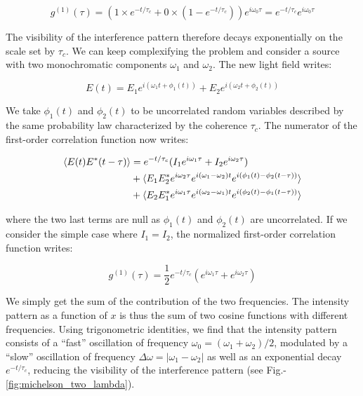 \begin{equation}
    g^{(1)} (\tau) = (1 \times e^{-t/\tau_c} + 0 \times (1-e^{-t/\tau_c})) e^{i \omega_0 \tau} = e^{-t/\tau_c}  e^{i \omega_0 \tau}
\end{equation}

The visibility of the interference pattern therefore decays exponentially on the scale set by $\tau_c$. We can keep complexifying the problem and consider a source with two monochromatic components $\omega_1$ and $\omega_2$. The new light field writes:

\begin{equation}
    E(t)= E_1 e^{i (\omega_1 t + \phi_1(t))} + E_2 e^{i (\omega_2 t+ \phi_2(t))} 
\end{equation}

\noindent We take $\phi_1(t)$ and $\phi_2(t)$ to be uncorrelated random variables described by the same probability law characterized by the coherence $\tau_c$. The numerator of the first-order correlation function now writes:

\begin{equation}
\begin{split}
       \langle E(t) E^*(t-\tau)\rangle  &= e^{-t/\tau_c}  (I_1 e^{i \omega_1 \tau} + I_2 e^{i \omega_2 \tau}) \\ 
       &+ \langle E_1 E_2^* e^{i \omega_2 \tau} e^{i (\omega_1 - \omega_2)t} e^{i(\phi_1(t)-\phi_2(t-\tau))}\rangle \\
       &+ \langle E_2 E_1^* e^{i \omega_1 \tau} e^{i (\omega_2 - \omega_1)t} e^{i(\phi_2(t)-\phi_1(t-\tau))}\rangle
\end{split}
\end{equation}

\noindent where the two last terms are null as $\phi_1(t)$ and $\phi_2(t)$ are uncorrelated. If we consider the simple case where $I_1=I_2$, the normalized first-order correlation function writes:

\begin{equation}
    g^{(1)} (\tau) = \frac{1}{2}  e^{-t/\tau_c} (e^{i \omega_1 \tau} + e^{i \omega_2 \tau})
\end{equation}

\noindent We simply get the sum of the contribution of the two frequencies. The intensity pattern as a function of $x$ is thus the sum of two cosine functions with different frequencies. Using trigonometric identities, we find that the intensity pattern consists of a ``fast'' oscillation of frequency $\omega_0=(\omega_1 + \omega_2)/2$, modulated by a ``slow'' oscillation of frequency $\Delta \omega = |\omega_1 - \omega_2|$ as well as an exponential decay $e^{-t/\tau_c}$, reducing the visibility of the interference pattern (see Fig.-\ref{fig:michelson_two_lambda}).

